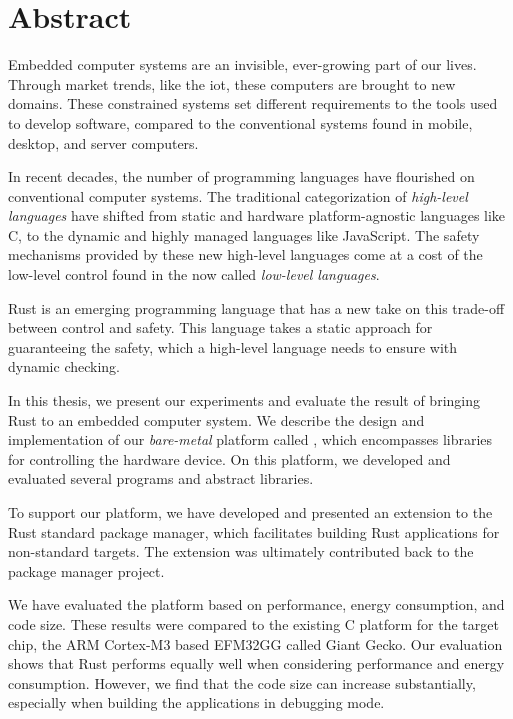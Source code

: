
\chapter{Abstract}
\label{chap:abstract}

Embedded computer systems are an invisible, ever-growing part of our lives.
Through market trends, like the \glsdesc{iot}, these computers are brought to new domains.
These constrained systems set different requirements to the tools used to develop software, compared to the conventional systems found in mobile, desktop, and server computers.

In recent decades, the number of programming languages have flourished on conventional computer systems.
The traditional categorization of \emph{high-level languages} have shifted from static and hardware platform-agnostic languages like C, to the dynamic and highly managed languages like JavaScript.
The safety mechanisms provided by these new high-level languages come at a cost of the low-level control found in the now called \emph{low-level languages}.

Rust is an emerging programming language that has a new take on this trade-off between control and safety.
This language takes a static approach for guaranteeing the safety, which a high-level language needs to ensure with dynamic checking.

In this thesis, we present our experiments and evaluate the result of bringing Rust to an embedded computer system.
We describe the design and implementation of our \emph{bare-metal} platform called {\rg}, which encompasses libraries for controlling the hardware device.
On this platform, we developed and evaluated several programs and abstract libraries.

To support our platform, we have developed and presented an extension to the Rust standard package manager, which facilitates building Rust applications for non-standard targets.
The extension was ultimately contributed back to the package manager project.

We have evaluated the platform based on performance, energy consumption, and code size.
These results were compared to the existing C platform for the target chip, the ARM Cortex-M3 based EFM32GG called Giant Gecko.
Our evaluation shows that Rust performs equally well when considering performance and energy consumption.
However, we find that the code size can increase substantially, especially when building the applications in debugging mode.

